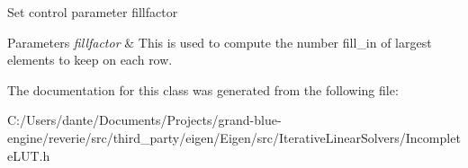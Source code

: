 Set control parameter fillfactor 
\begin{DoxyParams}{Parameters}
{\em fillfactor} & This is used to compute the number {\ttfamily fill\+\_\+in} of largest elements to keep on each row. \\
\hline
\end{DoxyParams}


The documentation for this class was generated from the following file\+:\begin{DoxyCompactItemize}
\item 
C\+:/\+Users/dante/\+Documents/\+Projects/grand-\/blue-\/engine/reverie/src/third\+\_\+party/eigen/\+Eigen/src/\+Iterative\+Linear\+Solvers/Incomplete\+L\+U\+T.\+h\end{DoxyCompactItemize}
